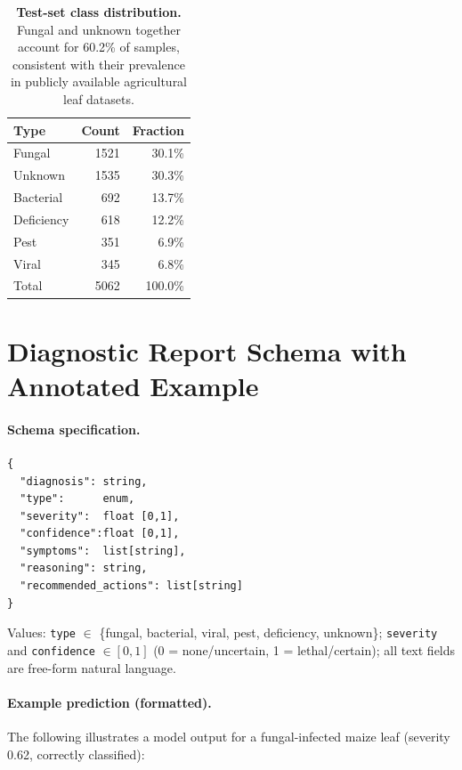 \documentclass{article}
\begin{document}
\begin{table}[h]
\centering
\caption{\textbf{Test-set class distribution.}
  Fungal and unknown together account for 60.2\% of samples, consistent
  with their prevalence in publicly available agricultural leaf datasets.}
\label{tab:classdist}
\small
\begin{tabular}{@{}lrr@{}}
\toprule
\textbf{Type} & \textbf{Count} & \textbf{Fraction} \\
\midrule
Fungal     & 1521 & 30.1\% \\
Unknown    & 1535 & 30.3\% \\
Bacterial  & 692  & 13.7\% \\
Deficiency & 618  & 12.2\% \\
Pest       & 351  & 6.9\%  \\
Viral      & 345  & 6.8\%  \\
\midrule
Total      & 5062 & 100.0\% \\
\bottomrule
\end{tabular}
\end{table}

\section{Diagnostic Report Schema with Annotated Example}
\label{app:schema}

\paragraph{Schema specification.}

\begin{lstlisting}
{
  "diagnosis": string,
  "type":      enum,
  "severity":  float [0,1],
  "confidence":float [0,1],
  "symptoms":  list[string],
  "reasoning": string,
  "recommended_actions": list[string]
}
\end{lstlisting}

\noindent Values: \texttt{type} $\in$ \{fungal, bacterial, viral, pest, deficiency, unknown\};
\texttt{severity} and \texttt{confidence} $\in [0,1]$ (0 = none/uncertain,
1 = lethal/certain); all text fields are free-form natural language.

\paragraph{Example prediction (formatted).}
The following illustrates a model output for a fungal-infected maize
leaf (severity 0.62, correctly classified):
\end{document}
